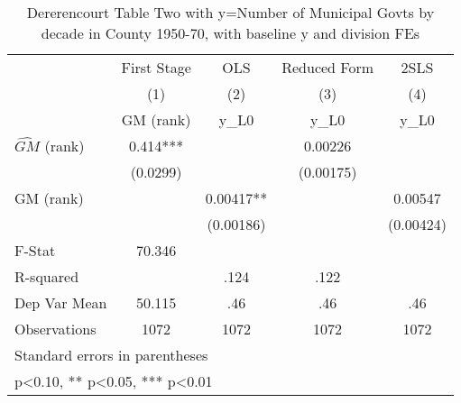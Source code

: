 \begin{table}[htbp]\centering
\def\sym#1{\ifmmode^{#1}\else\(^{#1}\)\fi}
\caption{Dererencourt Table Two with y=Number of Municipal Govts by decade in County 1950-70, with baseline y and division FEs}
\begin{tabular}{l*{4}{c}}
\toprule
                    & First Stage   &         OLS   &Reduced Form   &        2SLS   \\
                    &\multicolumn{1}{c}{(1)}&\multicolumn{1}{c}{(2)}&\multicolumn{1}{c}{(3)}&\multicolumn{1}{c}{(4)}\\
                    &\multicolumn{1}{c}{GM  (rank)}&\multicolumn{1}{c}{y\_L0}&\multicolumn{1}{c}{y\_L0}&\multicolumn{1}{c}{y\_L0}\\
\midrule
$\hat{GM}$ (rank)   &       0.414***&               &     0.00226   &               \\
                    &    (0.0299)   &               &   (0.00175)   &               \\
\addlinespace
GM  (rank)          &               &     0.00417** &               &     0.00547   \\
                    &               &   (0.00186)   &               &   (0.00424)   \\
\midrule
F-Stat              &      70.346   &               &               &               \\
R-squared           &               &        .124   &        .122   &               \\
Dep Var Mean        &      50.115   &         .46   &         .46   &         .46   \\
Observations        &        1072   &        1072   &        1072   &        1072   \\
\bottomrule
\multicolumn{5}{l}{\footnotesize Standard errors in parentheses}\\
\multicolumn{5}{l}{\footnotesize * p<0.10, ** p<0.05, *** p<0.01}\\
\end{tabular}
\end{table}
